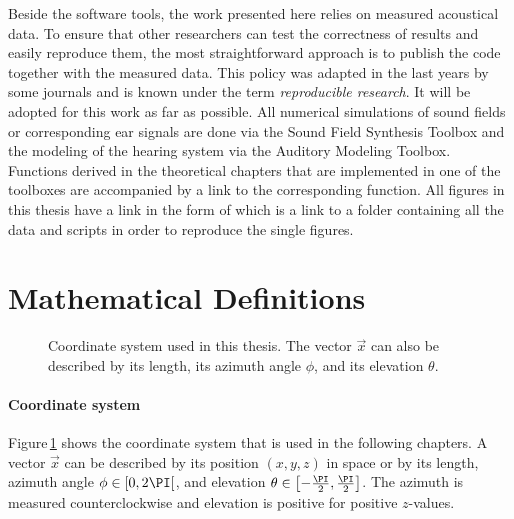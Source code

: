 Beside the software tools, the work presented here relies on measured acoustical
data.
To ensure that other
researchers can test the correctness of results and easily reproduce them,
the most straightforward approach is to publish the code together with the
measured data.
This policy was adapted in the last years by some journals and is known under the
term \emph{reproducible research}.
It will be adopted for this work as far as possible. All numerical
simulations of sound fields or corresponding ear signals are done via the Sound
Field Synthesis
Toolbox and the modeling of
the hearing system via the Auditory Modeling
Toolbox.
Functions derived in the theoretical chapters that are implemented in one of the
toolboxes are accompanied by a link to the corresponding function. All figures in
this thesis have a link in the form of \reproduce{\GITHUBBASE} which is a link to a
folder containing all the data and scripts in order to reproduce the single
figures.



\section{Mathematical Definitions}
\label{sec:mathematical_definitions}
%
\begin{figure}
    \centering
    \small
    
    \caption{Coordinate system used in this thesis. The vector $\vec{x}$ can also
    be described by its length, its azimuth angle $\phi$, and its elevation
    $\theta$.
    }
    \label{fig:coordinate_system}
\end{figure}
%
\paragraph{Coordinate system}
Figure\,\ref{fig:coordinate_system} shows the coordinate system that is used in
the following chapters. A vector $\vec{x}$ can be described by its position
$(x,y,z)$ in space or by its length, azimuth angle $\phi \in [0,2\PI[$,
and elevation $\theta \in \left[-\frac{\PI}{2},\frac{\PI}{2}\right]$.
The azimuth is measured counterclockwise and elevation is positive
for positive $z$-values.


